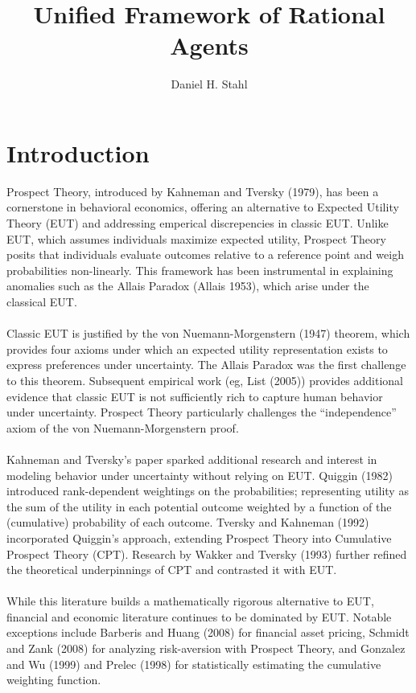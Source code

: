 \documentclass{article}
\begin{document}
	
	
\title{Unified Framework of Rational Agents}
\date{}
\author{Daniel H. Stahl}

\section{Introduction}

Prospect Theory, introduced by Kahneman and Tversky (1979), has been a cornerstone in behavioral economics, offering an alternative to Expected Utility Theory (EUT) and addressing emperical discrepencies in classic EUT. Unlike EUT, which assumes individuals maximize expected utility, Prospect Theory posits that individuals evaluate outcomes relative to a reference point and weigh probabilities non-linearly. This framework has been instrumental in explaining anomalies such as the Allais Paradox (Allais 1953), which arise under the classical EUT.  
\\
\\
Classic EUT is justified by the von Nuemann-Morgenstern (1947) theorem, which provides four axioms under which an expected utility representation exists to express preferences under uncertainty.  The Allais Paradox was the first challenge to this theorem.  Subsequent empirical work (eg, List (2005)) provides additional evidence that classic EUT is not sufficiently rich to capture human behavior under uncertainty.  Prospect Theory particularly challenges the ``independence'' axiom of the von Nuemann-Morgenstern proof.
\\
\\
Kahneman and Tversky's paper sparked additional research and interest in modeling behavior under uncertainty without relying on EUT.  Quiggin (1982) introduced rank-dependent weightings on the probabilities; representing utility as the sum of the utility in each potential outcome weighted by a function of the (cumulative) probability of each outcome. Tversky and Kahneman (1992) incorporated Quiggin's approach, extending Prospect Theory into Cumulative Prospect Theory (CPT).  Research by Wakker and Tversky (1993) further refined the theoretical underpinnings of CPT and contrasted it with EUT.
\\
\\
While this literature builds a mathematically rigorous alternative to EUT, financial and economic literature continues to be dominated by EUT.  Notable exceptions include Barberis and Huang (2008) for financial asset pricing, Schmidt and Zank (2008) for analyzing risk-aversion with Prospect Theory, and Gonzalez and Wu (1999) and Prelec (1998) for statistically estimating the cumulative weighting function.  
\end{document}
